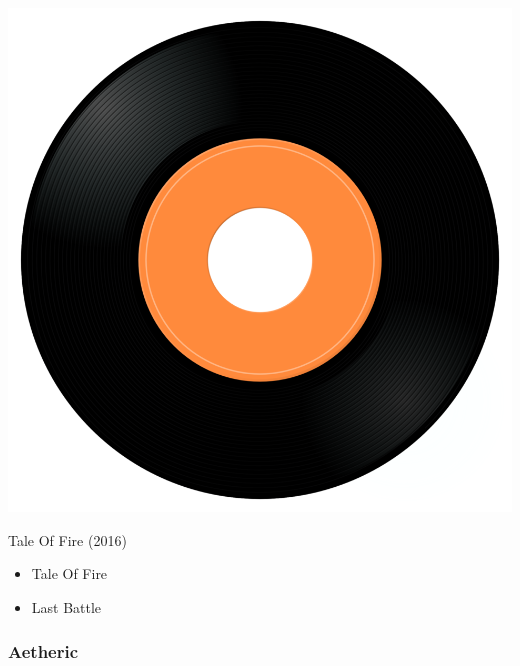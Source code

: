 \begin{minipage}[t]{0.25\textwidth}\vspace{0pt}
\captionsetup{type=figure}
\includegraphics[width=\textwidth]{Images/cover.png}
\caption*{Tale Of Fire (2016)}
\end{minipage}
\begin{minipage}[t]{0.25\textwidth}\vspace{0pt}
\begin{itemize}[nosep,leftmargin=1em,labelwidth=*,align=left]
	\setlength{\itemsep}{0pt}
	\item Tale Of Fire
	\item Last Battle
\end{itemize}
\end{minipage}

\subsubsection{Aetheric}

